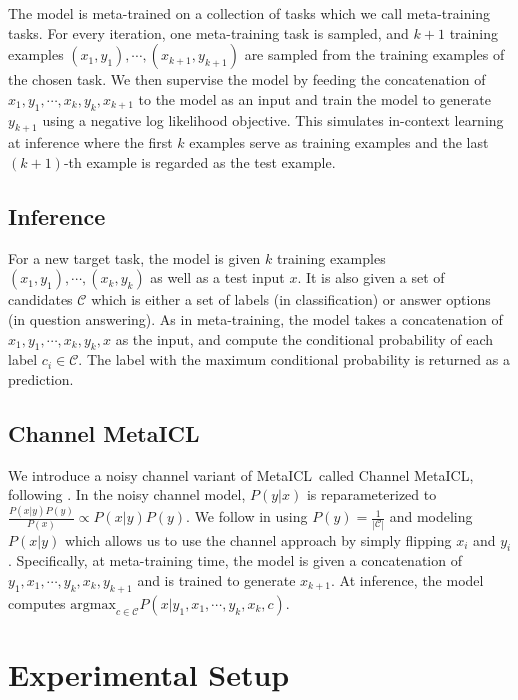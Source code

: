 The model is meta-trained on a collection of tasks which we call meta-training tasks. For every iteration, one meta-training task is sampled, and $k+1$ training examples $(x_1,y_1), \cdots, (x_{k+1},y_{k+1})$ are sampled from the training examples of the chosen task. We then supervise the model by feeding the concatenation of $x_1, y_1, \cdots, x_k, y_k, x_{k+1}$ to the model as an input and train the model to generate $y_{k+1}$ using a negative log likelihood objective. This simulates in-context learning at inference where the first $k$ examples serve as training examples and the last $(k+1)$-th example is regarded as the test example.

\subsection{Inference}\label{subsec:inference}

For a new target task, the model is given $k$ training examples $(x_1, y_1), \cdots, (x_k, y_k)$ as well as a test input $x$. It is also given a set of candidates $\mathcal{C}$ which is either a set of labels (in classification) or answer options (in question answering). As in meta-training, the model takes a concatenation of $x_1, y_1, \cdots, x_k, y_k, x$ as the input, and compute the conditional probability of each label $c_i \in \mathcal{C}$.
The label with the maximum conditional probability is returned as a prediction.

\subsection{Channel MetaICL}\label{subsec:channel-mic}
We introduce a noisy channel variant of MetaICL\ called Channel MetaICL, following \citet{min2022noisy}.
In the noisy channel model, $P(y|x)$ is reparameterized to
$\frac{P(x|y)P(y)}{P(x)} \propto P(x|y)P(y)$. We follow \citet{min2022noisy} in using $P(y)=\frac{1}{|\mathcal{C}|}$ and modeling $P(x|y)$ which allows us to use the channel approach by simply flipping $x_i$ and $y_i$. Specifically, at meta-training time, the model is given a concatenation of $y_1, x_1, \cdots, y_k, x_k, y_{k+1}$ and is trained to generate $x_{k+1}$. At inference, the model computes $\mathrm{argmax}_{c \in \mathcal{C}} P(x|y_1,x_1,\cdots,y_k,x_k,c)$. 

\section{Experimental Setup}\label{sec:exp-setup}

